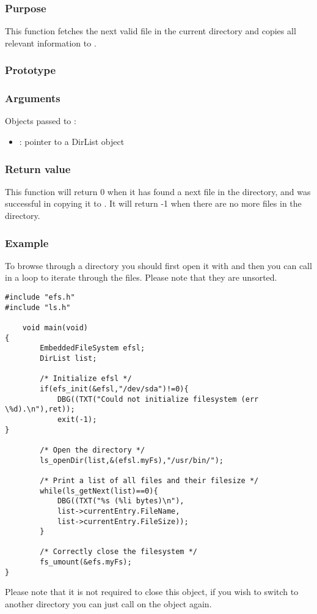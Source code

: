 \subsubsection*{Purpose}
This function fetches the next valid file in the current directory and copies
all relevant information to .
\subsubsection*{Prototype}
\subsubsection*{Arguments}
Objects passed to :
\begin{itemize}
	\item{: pointer to a DirList object}
\end{itemize}
\subsubsection*{Return value}
This function will return 0 when it has found a next file in the directory, and
was successful in copying it to . It will return -1
when there are no more files in the directory.

\subsubsection*{Example}
To browse through a directory you should first open it with  and
then you can call  in a loop to iterate through the files. Please
note that they are unsorted.
\lstset{numbers=left, stepnumber=1, numberstyle=\small, numbersep=5pt, tabsize=4}
\begin{lstlisting}
#include "efs.h"
#include "ls.h"

	void main(void)
{
		EmbeddedFileSystem efsl;
		DirList list;

		/* Initialize efsl */
		if(efs_init(&efsl,"/dev/sda")!=0){
			DBG((TXT("Could not initialize filesystem (err \%d).\n"),ret));
			exit(-1);
}

		/* Open the directory */
		ls_openDir(list,&(efsl.myFs),"/usr/bin/");

		/* Print a list of all files and their filesize */
		while(ls_getNext(list)==0){
			DBG((TXT("%s (%li bytes)\n"),
			list->currentEntry.FileName,
			list->currentEntry.FileSize));
		}

		/* Correctly close the filesystem */
		fs_umount(&efs.myFs);
}
\end{lstlisting}

Please note that it is not required to close this object, if you wish to switch
to another directory you can just call  on the object again.
